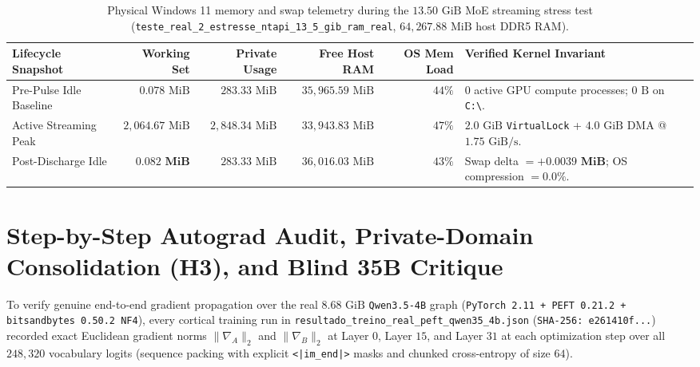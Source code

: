 \documentclass[10pt,a4paper]{article}
\begin{document}
\begin{table}[!htbp]
\centering
\caption{Physical Windows 11 memory and swap telemetry during the $13.50\text{ GiB}$ MoE streaming stress test (\texttt{teste\_\allowbreak{}real\_\allowbreak{}2\_\allowbreak{}estresse\_\allowbreak{}ntapi\_\allowbreak{}13\_\allowbreak{}5\_\allowbreak{}gib\_\allowbreak{}ram\_\allowbreak{}real}, $64,267.88\text{ MiB}$ host DDR5 RAM).}
\label{tab:ntapi}
\footnotesize
\begin{tabularx}{\linewidth}{@{}lrrrrY@{}}
\toprule
\textbf{Lifecycle Snapshot} & \textbf{Working Set} & \textbf{Private Usage} & \textbf{Free Host RAM} & \textbf{OS Mem Load} & \textbf{Verified Kernel Invariant} \\
\midrule
Pre-Pulse Idle Baseline & $0.078\text{ MiB}$ & $283.33\text{ MiB}$ & $35,965.59\text{ MiB}$ & $44\%$ & $0$ active GPU compute processes; $0\text{ B}$ on \texttt{C:\textbackslash}. \\
Active Streaming Peak & $2,064.67\text{ MiB}$ & $2,848.34\text{ MiB}$ & $33,943.83\text{ MiB}$ & $47\%$ & $2.0\text{ GiB}$ \texttt{VirtualLock} + $4.0\text{ GiB}$ DMA @ $1.75\text{ GiB/s}$. \\
Post-Discharge Idle & $\mathbf{0.082\text{ MiB}}$ & $283.33\text{ MiB}$ & $36,016.03\text{ MiB}$ & $43\%$ & Swap delta $= \mathbf{+0.0039\text{ MiB}}$; OS compression $= \mathbf{0.0\%}$. \\
\bottomrule
\end{tabularx}
\end{table}

\section{Step-by-Step Autograd Audit, Private-Domain Consolidation (H3), and Blind 35B Critique}

To verify genuine end-to-end gradient propagation over the real $8.68\text{ GiB}$ \texttt{Qwen3.5-4B} graph (\texttt{PyTorch 2.11 + PEFT 0.21.2 + bitsandbytes 0.50.2 NF4}), every cortical training run in \texttt{resultado\_\allowbreak{}treino\_\allowbreak{}real\_\allowbreak{}peft\_\allowbreak{}qwen35\_\allowbreak{}4b.json} (\texttt{SHA-256: e261410f...}) recorded exact Euclidean gradient norms $\|\nabla_A\|_2$ and $\|\nabla_B\|_2$ at Layer $0$, Layer $15$, and Layer $31$ at each optimization step over all $248,320$ vocabulary logits (sequence packing with explicit \texttt{<|im\_\allowbreak{}end|>} masks and chunked cross-entropy of size $64$).
\end{document}
